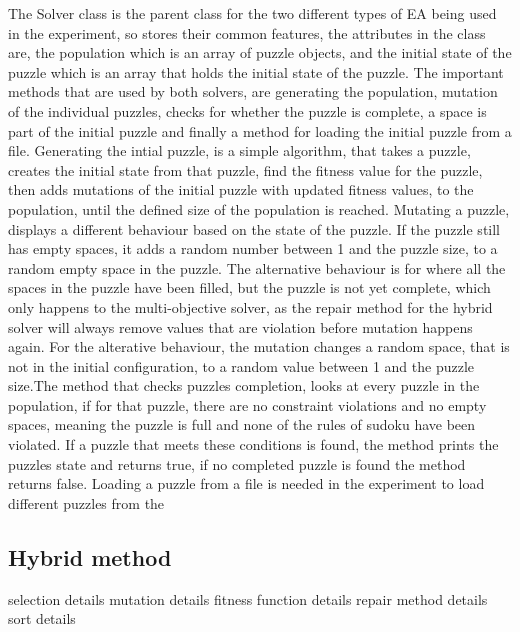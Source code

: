 \documentclass[a4paper,11pt]{article}
\begin{document}
The Solver class is the parent class for the two different types of EA being used in the experiment, so stores their common features, the attributes in the class are, the population which is an array of puzzle objects, and the initial state of the puzzle which is an array that holds the initial state of the puzzle. The important methods that are used by both solvers, are generating the population, mutation of the individual puzzles, checks for whether the puzzle is complete, a space is part of the initial puzzle and finally a method for loading the initial puzzle from a file.  \newline\newline Generating the intial puzzle, is a simple algorithm, that takes a puzzle, creates the initial state from that puzzle, find the fitness value for the puzzle, then adds mutations of the initial puzzle with updated fitness values, to the population, until the defined size of the population is reached. \newline\newline Mutating a puzzle, displays a different behaviour based on the state of the puzzle. If the puzzle still has empty spaces, it adds a random number between 1 and the puzzle size, to a random empty space in the puzzle. The alternative behaviour is for where all the spaces in the puzzle have been filled, but the puzzle is not yet complete, which only happens to the multi-objective solver, as the repair method for the hybrid solver will always remove values that are violation before mutation happens again. For the alterative behaviour, the mutation changes a random space, that is not in the initial configuration, to a random value between 1 and the puzzle size.\newline\newline The method that checks puzzles completion, looks at every puzzle in the population, if for that puzzle, there are no constraint violations and no empty spaces, meaning the puzzle is full and none of the rules of sudoku have been violated. If a puzzle that meets these conditions is found, the method prints the puzzles state and returns true, if no completed puzzle is found the method returns false. \newline\newline Loading a puzzle from a file is needed in the experiment to load different puzzles from the 

\subsection{Hybrid method}
selection details
mutation details
fitness function details
repair method details
sort details
\end{document}
